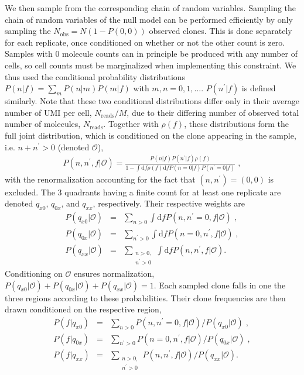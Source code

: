 \documentclass[letterpaper,english,prl,reprint,longbibliography]{revtex4-1} %
\begin{document}
We then sample from the corresponding chain of random variables.
Sampling the chain of random variables of the null model can be performed efficiently by only sampling the $N_{\textrm{obs}}=N(1-P(0,0))$ observed clones. This is done separately for each replicate, once conditioned on whether or not the other count is zero. 
Samples with 0 molecule counts can in principle be produced with any number of cells, so cell counts must be marginalized when implementing this constraint. We thus used the conditional probability distributions $P(n|f)=\sum_{m}P(n|m)P(m|f)$ with $m,n=0,1,\dots$. $P(n^\prime|f)$ is defined similarly. Note that these two conditional distributions differ only in their average number of UMI per cell, $N_{\textrm{reads}}/M$, due to their differing number of observed total number of molecules, $N_{\textrm{reads}}$. Together with $\rho(f)$, these distributions form the full joint distribution, which is conditioned on the clone appearing in the sample, i.e. $n+n^{\prime}>0$ (denoted $\mathcal{O}$), 
\begin{align}
	P(n,n^{\prime},f|\mathcal{O})= \frac{P(n|f)P(n^{\prime}|f)\rho(f)}{1-\int{\textrm{d}f \rho(f)\textrm{d}f P(n=0|f)P(n^{\prime}=0|f)}}\;,  
\end{align}
with the renormalization accounting for the fact that $(n,n^{\prime})=(0,0)$ is excluded. The 3 quadrants having a finite count for at least one replicate are denoted $q_{x0}$, $q_{0x}$, and $q_{xx}$, respectively. Their respective weights are
\begin{align}
	P(q_{x0}|\mathcal{O})&=&\sum_{n>0}\int{\textrm{d}f P(n,n^{\prime}=0,f|\mathcal{O})}\;,\\
	P(q_{0x}|\mathcal{O})&=&\sum_{n^{\prime}>0}\int{\textrm{d}f P(n=0,n^{\prime},f|\mathcal{O})}\;,\\
	P(q_{xx}|\mathcal{O})&=&\sum_{\substack{n>0,\\n^{\prime}>0}}\int{\textrm{d}f P(n,n^{\prime},f|\mathcal{O})}.
\end{align}
Conditioning on $\mathcal{O}$ ensures normalization, $P(q_{x0}|\mathcal{O})+P(q_{0x}|\mathcal{O})+P(q_{xx}|\mathcal{O})=1$. Each sampled clone falls in one the three regions according to these probabilities. Their clone frequencies are then drawn conditioned on the respective region, 
\begin{align}
	P(f|q_{x0})&=&\sum_{n>0}P(n,n^{\prime}=0,f|\mathcal{O})/P(q_{x0}|\mathcal{O})\;,\\
	P(f|q_{0x})&=&\sum_{n^{\prime}>0}P(n=0,n^{\prime},f|\mathcal{O})/P(q_{0x}|\mathcal{O})\;,\\
	P(f|q_{xx})&=&\sum_{\substack{n>0,\\n^{\prime}>0}}P(n,n^{\prime},f|\mathcal{O})/P(q_{xx}|\mathcal{O}).
\end{align}
\end{document}
